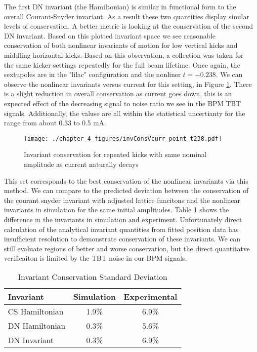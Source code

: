 The first DN invariant (the Hamiltonian) is similar in functional form to the overall Courant-Snyder invariant. As a result these two quantities display similar levels of conservation. A better metric is looking at the conservation of the second DN invariant. Based on this plotted invariant space we see reasonable conservation of both nonlinear invariants of motion for low vertical kicks and middling horizontal kicks. Based on this observation, a collection was taken for the same kicker settings repeatedly for the full beam lifetime. Once again, the sextupoles are in the "lilac" configuration and the nonliner $t=-0.238$. We can observe the nonlinear invariants versus current for this setting, in Figure \ref{fig:pointCurrent}. There is a slight reduction in overall conservation as current goes down, this is an expected effect of the decreasing signal to noise ratio we see in the BPM TBT signals. Additionally, the valuse are all within the statistical uncertianty for the range from about 0.33 to 0.5 mA.

\begin{figure}
	\centering
	\texttt{[image: ./chapter\_4\_figures/invConsVcurr\_point\_t238.pdf]}
	\caption{Invariant conservation for repeated kicks with same nominal amplitude as current naturally decays}
	\label{fig:pointCurrent}
\end{figure}

This set corresponds to the best conservation of the nonlinear invariants via this method. We can compare to the predicted deviation between the conservation of the courant snyder invariant with adjusted lattice funcitons and the nonlinear invariants in simulation for the same initial amplitudes. Table \ref{tab:invConsv} shows the difference in the invariants in simulation and experiment. Unfortunately direct calculation of the analytical invariant quantities from fitted position data has insufficient resolution to demonstrate conservation of these invariants. We can still evaluate regions of better and worse conservation, but the direct quantitatve verificaiton is limited by the TBT noise in our BPM signals.

\begin{table}
    \centering
    \begin{tabular}{lcc}
        \toprule
        \textbf{Invariant} & \textbf{Simulation} & \textbf{Experimental}\\
        \midrule
        CS Hamiltonian & 1.9\% & 6.9\% \\
        DN Hamiltonian & 0.3\% & 5.6\% \\
        DN Invariant & 0.3\% & 6.9\% \\
        \bottomrule
    \end{tabular}
    \caption{Invariant Conservation Standard Deviation}
    \label{tab:invConsv}
\end{table}


